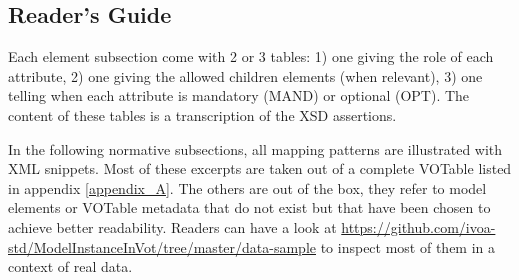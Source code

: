 \subsection{Reader's Guide}

Each element subsection come with 2 or 3 tables: 1) one giving the role of each attribute, 
2) one giving the allowed children elements (when relevant), 3) one telling when each attribute 
is mandatory (MAND) or optional (OPT). 
The content of these tables is a transcription of the XSD assertions.

In the following normative subsections, all mapping patterns are illustrated with XML snippets.
Most of these excerpts are taken out of a complete VOTable listed in appendix \ref{appendix_A}.
The others are out of the box, they refer to model elements or VOTable metadata that do not exist 
but that have been chosen to achieve better readability. 
Readers can have a look at \url{https://github.com/ivoa-std/ModelInstanceInVot/tree/master/data-sample} 
to inspect most of them in a context of real data.

